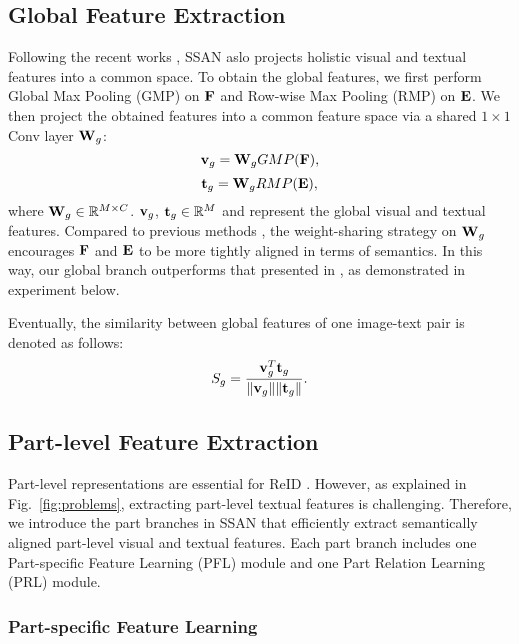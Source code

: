 \documentclass[journal]{IEEEtran}
\begin{document}
\subsection{Global Feature Extraction}
\label{sec:globalFea}
Following the recent works \cite{jing2020pose,niu2020improving,wang2020vitaa}, SSAN aslo projects holistic visual and textual features into a common space. To obtain the global features, we first perform Global Max Pooling (GMP) on $\bf{F}$ and Row-wise Max Pooling (RMP) on $\bf{E}$. We then project the obtained features into a common feature space via a shared $1\times1$ Conv layer ${\bf{W}}_g$:
\begin{equation}
{\bf{v}}_{g} = {\bf{W}}_{g}GMP({\bf{F}}),
\end{equation}
\begin{equation}
{\bf{t}}_g = {\bf{W}}_{g}RMP({\bf{E}}),
\end{equation}
where ${\bf{W}}_{g} \in \mathbb{R}^{M \times C}$. ${\bf{v}}_g$, ${\bf{t}}_g \in \mathbb{R}^{M}$ and represent the global visual and textual features. Compared to previous methods \cite{jing2020pose,wang2020vitaa}, the weight-sharing strategy on ${\bf{W}}_g$ encourages $\bf{F}$ and $\bf{E}$ to be more tightly aligned in terms of semantics. In this way, our global branch outperforms that presented in \cite{jing2020pose,wang2020vitaa}, as demonstrated in experiment below.

Eventually, the similarity between global features of one image-text pair is denoted as follows:
\begin{equation}
S_{g}=\frac{{\bf{v}}_{g}^{T} {\bf{t}}_{g}}{\|{\bf{v}}_g\| \|{\bf{t}}_g\|}.
\label{equ:cosine_similarity}
\end{equation}

\subsection{Part-level Feature Extraction}\label{setion3.3}
Part-level representations are essential for ReID \cite{jing2020pose,niu2020improving,wang2020vitaa}. However, as explained in Fig.~\ref{fig:problems}, extracting part-level textual features is challenging. Therefore, we introduce the part branches in SSAN that efficiently extract semantically aligned part-level visual and textual features. Each part branch includes one Part-specific Feature Learning (PFL) module and one Part Relation Learning (PRL) module.

\subsubsection{Part-specific Feature Learning}
\end{document}
